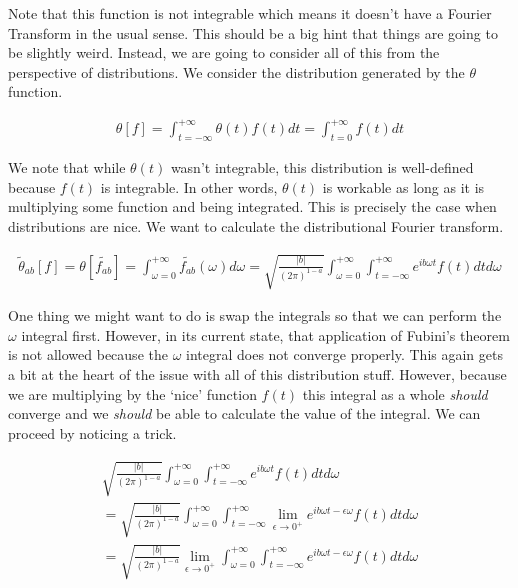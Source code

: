 \documentclass[12pt]{article}
\begin{document}
Note that this function is not integrable which means it doesn't have a Fourier Transform in the usual sense. This should be a big hint that things are going to be slightly weird. Instead, we are going to consider all of this from the perspective of distributions. We consider the distribution generated by the $\theta$ function.

\begin{align}
\theta[f] = \int_{t=-\infty}^{+\infty} \theta(t)f(t) dt = \int_{t=0}^{+\infty} f(t) dt
\end{align}

We note that while $\theta(t)$ wasn't integrable, this distribution is well-defined because $f(t)$ is integrable. In other words, $\theta(t)$ is workable as long as it is multiplying some function and being integrated. This is precisely the case when distributions are nice. We want to calculate the distributional Fourier transform.

\begin{align}
\tilde{\theta}_{ab}[f] = \theta[\tilde{f_{ab}}] = \int_{\omega=0}^{+\infty} \tilde{f_{ab}}(\omega) d\omega = \sqrt{\frac{|b|}{(2\pi)^{1-a}}} \int_{\omega = 0}^{+\infty} \int_{t=-\infty}^{+\infty} e^{i b \omega t} f(t) dt d\omega
\end{align}

One thing we might want to do is swap the integrals so that we can perform the $\omega$ integral first. However, in its current state, that application of Fubini's theorem is not allowed because the $\omega$ integral does not converge properly. This again gets a bit at the heart of the issue with all of this distribution stuff. However, because we are multiplying by the `nice' function $f(t)$ this integral as a whole \textit{should} converge and we \textit{should} be able to calculate the value of the integral. We can proceed by noticing a trick.

\begin{align}
 \sqrt{\frac{|b|}{(2\pi)^{1-a}}} \int_{\omega = 0}^{+\infty} \int_{t=-\infty}^{+\infty} e^{i b \omega t} f(t) dt d\omega\\
 =  \sqrt{\frac{|b|}{(2\pi)^{1-a}}} \int_{\omega = 0}^{+\infty} \int_{t=-\infty}^{+\infty} \lim_{\epsilon \to 0^+} e^{i b \omega t - \epsilon \omega} f(t) dt d\omega 
 \\=  \sqrt{\frac{|b|}{(2\pi)^{1-a}}} \lim_{\epsilon \to 0^+} \int_{\omega = 0}^{+\infty} \int_{t=-\infty}^{+\infty}  e^{i b\omega t - \epsilon \omega} f(t) dt d\omega
\end{align}
\end{document}
